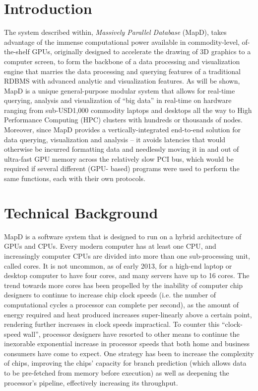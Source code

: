 \documentclass[twocolumn]{article}
\begin{document}

\section{Introduction}
The system described within, \textit{Massively Parallel Database} (MapD), takes advantage of the immense computational power available in commodity-level, of-the-shelf GPUs, originally designed to accelerate the drawing of 3D graphics to a computer screen, to form the backbone of a data processing and visualization engine that marries the data processing and querying features of a traditional RDBMS with advanced analytic and visualization features. As will be shown, MapD is a unique general-purpose modular system that allows for real-time querying, analysis and visualization of “big data” in real-time on hardware ranging from sub-USD1,000 commodity laptops and desktops all the way to High Performance Computing (HPC) clusters with hundreds or thousands of nodes. Moreover, since MapD provides a vertically-integrated end-to-end solution for data querying, visualization and analysis – it avoids latencies that would otherwise be incurred formatting data and needlessly moving it in and out of ultra-fast GPU memory across the relatively slow PCI bus, which would be required if several different (GPU- based) programs were used to perform the same functions, each with their own protocols.

\section{Technical Background}
MapD is a software system that is designed to run on a hybrid architecture of GPUs and CPUs. Every modern computer has at least one CPU, and increasingly computer CPUs are divided into more than one sub-processing unit, called cores. It is not uncommon, as of early 2013, for a high-end laptop or desktop computer to have four cores, and many servers have up to 16 cores. The trend towards more cores has been propelled by the inability of computer chip designers to continue to increase chip clock speeds (i.e. the number of computational cycles a processor can complete per second), as the amount of energy required and heat produced increases super-linearly above a certain point, rendering further increases in clock speeds impractical. To counter this “clock-speed wall”, processor designers have resorted to other means to continue the inexorable exponential increase in processor speeds that both home and business consumers have come to expect. One strategy has been to increase the complexity of chips, improving the chips’ capacity for branch prediction (which allows data to be pre-fetched
from memory before execution) as well as deepening the processor’s pipeline, effectively increasing its throughput.
\end{document}
